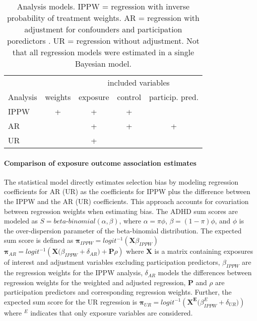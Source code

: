 \documentclass[12pt]{article}
\begin{document}
\begin{table}
	\centering
	\begin{tabular}{lcccc}
		\hline
		& & \multicolumn{3}{c}{included variables} \\ \cline{3-5}
		Analysis & weights & exposure  & control  & particip. pred. \\ 
		\hline
		IPPW     &    +    &         +          &         +          & \\
		AR       &         &         +          &         +          &  + \\
		UR       &         &         +          &                   & \\
		\hline
	\end{tabular}
	\caption{Analysis models. IPPW = regression with inverse probability of treatment weights. AR = regression with adjustment for confounders and participation poredictors . UR = regression without adjustment. Not that all regression models were estimated in a single Bayesian model.} 
	\label{tab:regmodels}
\end{table}

\paragraph{Comparison of exposure outcome association estimates} The statistical model directly estimates selection bias by modeling regression coefficients for AR (UR) as the coefficients for IPPW plus the difference between the IPPW and the AR (UR) coefficients. This approach accounts for covariation between regression weights when estimating bias. The ADHD sum scores are modeled as  $S = beta$-$binomial(\alpha,\beta)$, where $\alpha = \pi\phi$, $\beta = (1-\pi)\phi$, and $\phi$ is the over-dispersion parameter of the beta-binomial distribution. The expected sum score is defined as 
\newline
$\mathbf{\pi}_{IPPW} = logit^{-1}(\mathbf{X} \beta_{IPPW})$ 
\newline
$\mathbf{\pi}_{AR} = logit^{-1}(\mathbf{X} \big( \beta_{IPPW} + \delta_{AR} \big) + \mathbf{P}\rho)$
\newline
where \textbf{X} is a matrix containing exposures of interest and adjustment variables excluding participation predictors, $\beta_{IPPW}$ are the regression weights for the IPPW analysis, $\delta_{AR}$ models the differences between regression weights for the weighted and adjusted regression, \textbf{P} and $\rho$ are participation predictors and corresponding regression weights. Further, the expected sum score for the UR regression is
\newline
$\mathbf{\pi}_{UR} = logit^{-1}(\mathbf{X^E} \big( \beta^E_{IPPW} + \delta_{UR} \big))$
\newline
where $^E$ indicates that only exposure variables are considered.
\end{document}
